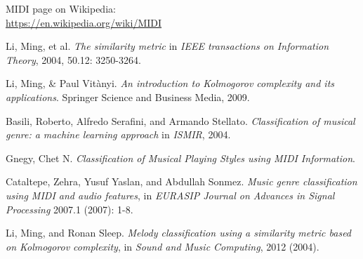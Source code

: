 \documentclass[a4paper]{article}
\begin{document}
	\begin{thebibliography}{1}
		 MIDI page on Wikipedia:\\
		\href{https://en.wikipedia.org/wiki/MIDI}{https://en.wikipedia.org/wiki/MIDI}
		
		 Li, Ming, et al. {\em The similarity metric} in \textit{IEEE transactions on Information Theory}, 2004, 50.12: 3250-3264.
		
		 Li, Ming, \& Paul Vit\`{a}nyi. {\em An introduction to Kolmogorov complexity and its applications}. Springer Science and Business Media, 2009.
		
		 Basili, Roberto, Alfredo Serafini, and Armando Stellato. {\em Classification of musical genre: a machine learning approach} in \textit{ISMIR}, 2004.
		
		 Gnegy, Chet N. {\em Classification of Musical Playing Styles using MIDI Information}.
		
		 Cataltepe, Zehra, Yusuf Yaslan, and Abdullah Sonmez. {\em Music genre classification using MIDI and audio features}, in \textit{EURASIP Journal on Advances in Signal Processing} 2007.1 (2007): 1-8.
		
		 Li, Ming, and Ronan Sleep. {\em Melody classification using a similarity metric based on Kolmogorov complexity}, in \textit{Sound and Music Computing}, 2012 (2004).
	\end{thebibliography}
\end{document}
